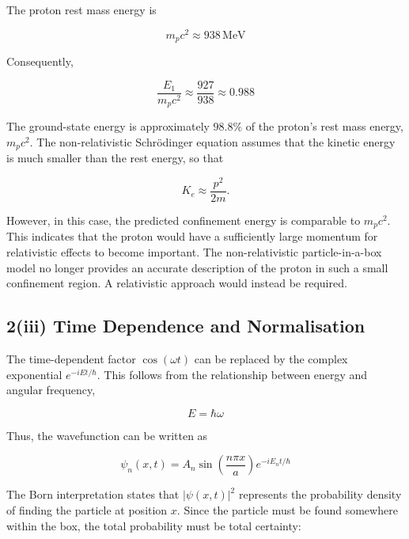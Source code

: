\documentclass{article}
\begin{document}
The proton rest mass energy is

\begin{equation*}
m_pc^2\approx938\,\mathrm{MeV}
\end{equation*}

Consequently,

\begin{equation*}
\frac{E_1}{m_pc^2} \approx \frac{927}{938} \approx 0.988
\end{equation*}

The ground-state energy is approximately $98.8\%$ of the proton's
rest mass energy, $m_pc^2$. The non-relativistic Schrödinger equation
assumes that the kinetic energy is much smaller than the rest energy,
so that

\begin{equation*}
K_e \approx \frac{p^2}{2m}.
\end{equation*}

However, in this case, the predicted confinement energy is comparable
to $m_pc^2$. This indicates that the proton would have a sufficiently
large momentum for relativistic effects to become important. The non-relativistic particle-in-a-box model no longer provides an accurate description of the proton in such a small confinement region. A relativistic approach would instead be required.


\subsection*{2(iii) Time Dependence and Normalisation}

The time-dependent factor $\cos(\omega t)$ can be replaced by the
complex exponential $e^{-iEt/\hbar}$. This follows from the
relationship between energy and angular frequency,

\begin{equation*}
E=\hbar\omega
\end{equation*}

Thus, the wavefunction can be written as

\begin{equation*}
\psi_n(x,t) = A_n \sin\left(\frac{n\pi x}{a}\right) e^{-iE_nt/\hbar}
\end{equation*}

The Born interpretation states that $|\psi(x,t)|^2$ represents the
probability density of finding the particle at position $x$. Since
the particle must be found somewhere within the box, the total
probability must be total certainty:
\end{document}
